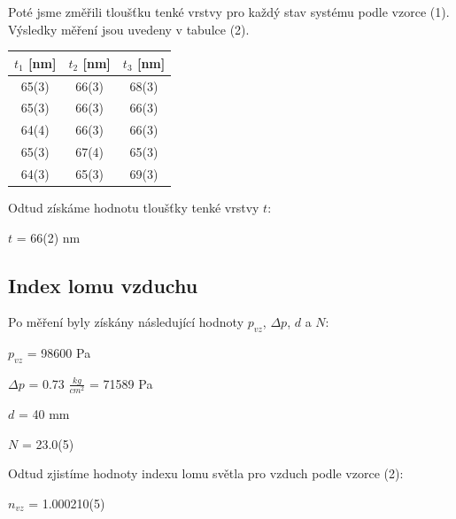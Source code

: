 \documentclass[a4paper,11pt]{article}
\begin{document}
    \hspace{10pt}
    \begin{minipage}[t]{0.5\textwidth}  
            \par Poté jsme změřili tloušťku tenké vrstvy pro každý stav systému podle vzorce (1). Výsledky měření jsou uvedeny v tabulce (2).
            \vspace{10pt}
            \par \centering
            \begin{tabular}{|c|c|c|}
                \hline
                $t_1$ [nm] & $t_2$ [nm] & $t_3$ [nm] \\
                \hline
                65(3) & 66(3) & 68(3) \\
                \hline
                65(3) & 66(3) & 66(3) \\
                \hline
                64(4) & 66(3) & 66(3) \\
                \hline
                65(3) & 67(4) & 65(3) \\
                \hline
                64(3) & 65(3) & 69(3) \\
                \hline
                \end{tabular}
            \captionsetup{justification=centering, font=footnotesize}
            \vspace{10pt}
            \raggedright
            \par Odtud získáme hodnotu tloušťky tenké vrstvy $t$:  
            \begin{center}
                $t$ = 66(2) nm
            \end{center}
        \subsection{Index lomu vzduchu}
            Po měření byly získány následující hodnoty $p_{vz}$, $\Delta p$, $d$ a $N$:
            \begin{center}
                $p_{vz}$ = 98600 Pa
                \vspace{5pt}
                \par $\Delta p$ = 0.73 $\frac{kg}{cm^2}$ = 71589 Pa
                \vspace{5pt}
                \par $d$ = 40 mm
                \vspace{5pt}
                \par $N$ = 23.0(5)
            \end{center}
            Odtud zjistíme hodnoty indexu lomu světla pro vzduch podle vzorce (2): 
            \begin{center}
                $n_{vz}$ = 1.000210(5)
            \end{center}

\end{minipage}
\end{document}
